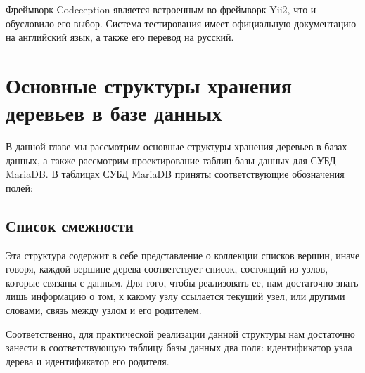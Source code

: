 \documentclass[a4paper,14pt]{extreport}
\theoremstyle{definition}
\begin{document}
Фреймворк Codeception является встроенным во фреймворк Yii2, что и обусловило его выбор. Система тестирования имеет официальную документацию на английский язык\cite{Cormen}, а также его перевод на русский\cite{codeceptionRus}.
\section{Основные структуры хранения деревьев в базе данных}
В данной главе мы рассмотрим основные структуры хранения деревьев в базах данных, а также рассмотрим проектирование таблиц базы данных для СУБД MariaDB.
В таблицах СУБД MariaDB приняты соответствующие обозначения полей:
\begin{table}[H]
\end{table}
\subsection{Список смежности}
Эта структура содержит в себе представление о коллекции списков вершин, иначе говоря, каждой вершине дерева соответствует список, состоящий из узлов, которые связаны с данным\cite{Groshev}.  Для того, чтобы реализовать ее, нам достаточно знать лишь информацию о том, к какому узлу ссылается текущий узел, или другими словами, связь между узлом и его родителем.

Соответственно, для практической реализации данной структуры нам достаточно занести в соответствующую таблицу базы данных два поля: идентификатор узла дерева и идентификатор его родителя\cite{Ermakov}.
\end{document}
